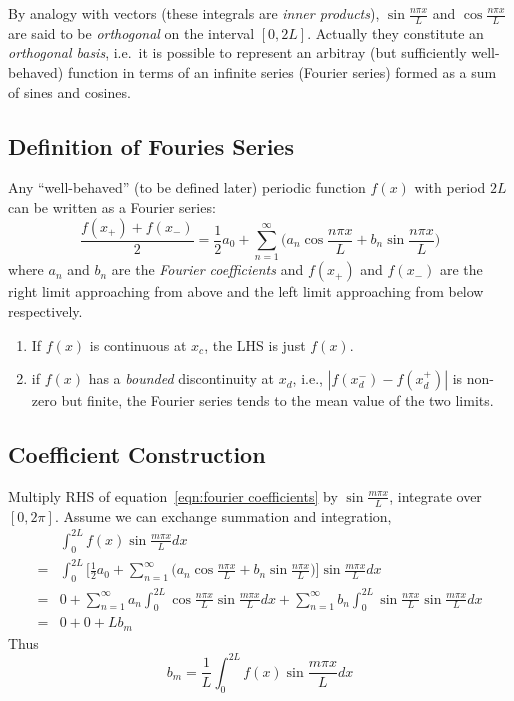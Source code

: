 \documentclass[a4paper]{article}
\begin{document}
By analogy with vectors (these integrals are \emph{inner products}), $\sin \frac{n\pi x}{L}$ and $\cos\frac{n\pi x}{L}$ are said to be \emph{orthogonal} on the interval $[0,2L]$. Actually they constitute an \emph{orthogonal basis}, i.e.\ it is possible to represent an arbitray (but sufficiently well-behaved) function in terms of an infinite series (Fourier series) formed as a sum of sines and cosines.

\subsection{Definition of Fouries Series}

Any ``well-behaved'' (to be defined later) periodic function $f(x)$ with period $2L$ can be written as a Fourier series:
\begin{equation}
  \label{eqn:fourier coefficients}
  \frac{f(x_+)+f(x_-)}{2} = \frac{1}{2}a_0 + \sum_{n=1}^\infty \Big(a_n\cos\frac{n\pi x}{L} +b_n\sin\frac{n\pi x}{L}\Big)
  \tag{$\ast$}
\end{equation}
where $a_n$ and $b_n$ are the \emph{Fourier coefficients} and $f(x_+)$ and $f(x_-)$ are the right limit approaching from above and the left limit approaching from below respectively.

\begin{enumerate}
\item If $f(x)$ is continuous at $x_c$, the LHS is just $f(x)$.
  \item if $f(x)$ has a \emph{bounded} discontinuity at $x_d$, i.e., $|f(x_d^-)-f(x_d^+)|$ is non-zero but finite, the Fourier series tends to the mean value of the two limits.
\end{enumerate}

\subsection{Coefficient Construction}

Multiply RHS of equation~\eqref{eqn:fourier coefficients} by $\sin \frac{m\pi x}{L}$, integrate over $[0, 2\pi]$. Assume we can exchange summation and integration,
\begin{align*}
  & \int_0^{2L} f(x)\sin\frac{m\pi x}{L} dx \\
  =& \int_0^{2L} \Bigg[ \frac{1}{2}a_0 + \sum_{n=1}^\infty \Big(a_n\cos\frac{n\pi x}{L} + b_n\sin\frac{n\pi x}{L}\Big) \Bigg] \sin\frac{m\pi x}{L} dx \\
  =& 0 + \sum_{n=1}^\infty a_n \int_0^{2L} \cos\frac{n\pi x}{L} \sin\frac{m\pi x}{L} dx +  \sum_{n=1}^\infty b_n \int_0^{2L} \sin\frac{n\pi x}{L} \sin\frac{m\pi x}{L} dx \\
  =& 0 + 0 + L b_m
\end{align*}
Thus
\[
  b_m = \frac{1}{L}\int_0^{2L} f(x) \sin\frac{m\pi x}{L} dx
\]
\end{document}
